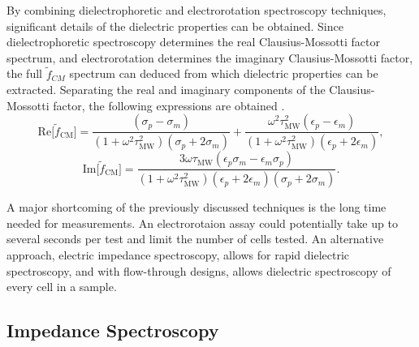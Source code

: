  \par By combining dielectrophoretic and electrorotation spectroscopy techniques, significant details of the dielectric properties can be obtained. Since dielectrophoretic spectroscopy determines the real Clausius-Mossotti factor spectrum, and electrorotation determines the imaginary Clausius-Mossotti factor, the full $\tilde{f}_{CM}$ spectrum can deduced from which dielectric properties can be extracted. Separating the real and imaginary components of the Clausius-Mossotti factor, the following expressions are obtained \cite{hober_zweites_1912, morgan_single_2007}.
 \begin{equation}
     \text{Re}\big[\tilde{f}_{\text{CM}}\big] = \frac{(\sigma_p - \sigma_m)}{(1+\omega^2\tau_{\text{MW}}^2)(\sigma_p + 2\sigma_m)} + \frac{\omega^2\tau^2_{\text{MW}}(\epsilon_p-\epsilon_m)}{(1+\omega^2\tau_{\text{MW}}^2)(\epsilon_p+2\epsilon_m)},
 \end{equation}
 \begin{equation}
     \text{Im}\big[\tilde{f}_{\text{CM}} \big] = \frac{3\omega\tau_{\text{MW}}(\epsilon_p\sigma_m-\epsilon_m\sigma_p)}{(1+\omega^2\tau^2_{\text{MW}})(\epsilon_p+2\epsilon_m)(\sigma_p+2\sigma_m)}.
 \end{equation}
 \par A major shortcoming of the previously discussed techniques is the long time needed for measurements. An electrorotaion assay could potentially take up to several seconds per test and limit the number of cells tested. An alternative approach, electric impedance spectroscopy, allows for rapid dielectric spectroscopy, and with flow-through designs, allows dielectric spectroscopy of every cell in a sample. 
 
 \subsection{Impedance Spectroscopy}
 \label{sec:impedance_spectroscopy}
